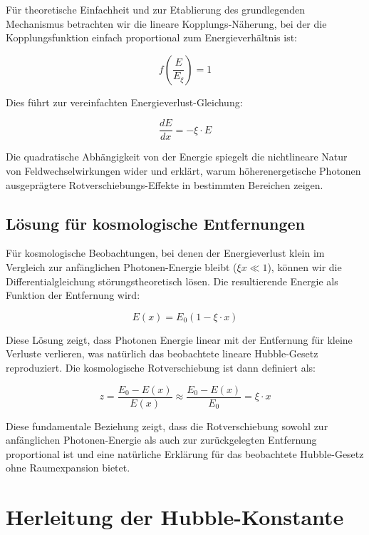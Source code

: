 	Für theoretische Einfachheit und zur Etablierung des grundlegenden Mechanismus betrachten wir die lineare Kopplungs-Näherung, bei der die Kopplungsfunktion einfach proportional zum Energieverhältnis ist:
	
	\begin{equation}
		f\left(\frac{E}{E_\xi}\right) = 1
	\end{equation}
	
	Dies führt zur vereinfachten Energieverlust-Gleichung:
	
	\begin{equation}
		\frac{dE}{dx} = -\xi \cdot E
	\end{equation}
	
	Die quadratische Abhängigkeit von der Energie spiegelt die nichtlineare Natur von Feldwechselwirkungen wider und erklärt, warum höherenergetische Photonen ausgeprägtere Rotverschiebungs-Effekte in bestimmten Bereichen zeigen.
	
	\subsection{Lösung für kosmologische Entfernungen}
	
	Für kosmologische Beobachtungen, bei denen der Energieverlust klein im Vergleich zur anfänglichen Photonen-Energie bleibt ($\xi x \ll 1$), können wir die Differentialgleichung störungstheoretisch lösen. Die resultierende Energie als Funktion der Entfernung wird:
	
	\begin{equation}
		E(x) = E_0 \left(1 - \xi \cdot x\right)
	\end{equation}
	
	Diese Lösung zeigt, dass Photonen Energie linear mit der Entfernung für kleine Verluste verlieren, was natürlich das beobachtete lineare Hubble-Gesetz reproduziert. Die kosmologische Rotverschiebung ist dann definiert als:
	
	\begin{equation}
		z = \frac{E_0 - E(x)}{E(x)} \approx \frac{E_0 - E(x)}{E_0} = \xi \cdot x
	\end{equation}
	
	Diese fundamentale Beziehung zeigt, dass die Rotverschiebung sowohl zur anfänglichen Photonen-Energie als auch zur zurückgelegten Entfernung proportional ist und eine natürliche Erklärung für das beobachtete Hubble-Gesetz ohne Raumexpansion bietet.
	
	\section{Herleitung der Hubble-Konstante}
	
